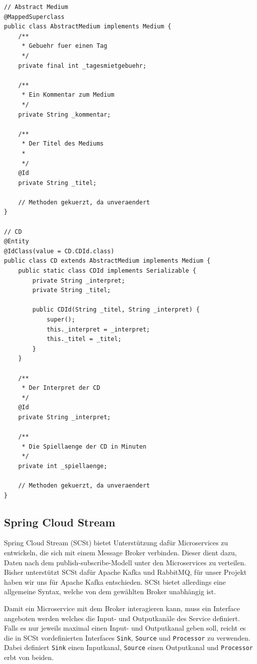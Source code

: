 \documentclass{article}
\begin{document}
\begin{lstlisting}
// Abstract Medium
@MappedSuperclass
public class AbstractMedium implements Medium {
    /**
     * Gebuehr fuer einen Tag
     */
    private final int _tagesmietgebuehr;

    /**
     * Ein Kommentar zum Medium
     */
    private String _kommentar;

    /**
     * Der Titel des Mediums
     *
     */
    @Id
    private String _titel;

    // Methoden gekuerzt, da unveraendert
}

// CD
@Entity
@IdClass(value = CD.CDId.class)
public class CD extends AbstractMedium implements Medium {
    public static class CDId implements Serializable {
        private String _interpret;
        private String _titel;

        public CDId(String _titel, String _interpret) {
            super();
            this._interpret = _interpret;
            this._titel = _titel;
        }
    }

    /**
     * Der Interpret der CD
     */
    @Id
    private String _interpret;

    /**
     * Die Spiellaenge der CD in Minuten
     */
    private int _spiellaenge;

    // Methoden gekuerzt, da unveraendert
}
\end{lstlisting}

\subsection{Spring Cloud Stream}

Spring Cloud Stream (SCSt) bietet Unterstützung dafür Microservices zu entwickeln, die sich mit einem Message Broker verbinden.
Dieser dient dazu, Daten nach dem publish-subscribe-Modell unter den Microservices zu verteilen.
Bisher unterstützt SCSt dafür Apache Kafka und RabbitMQ, für unser Projekt haben wir uns für Apache Kafka entschieden.
SCSt bietet allerdings eine allgemeine Syntax, welche von dem gewählten Broker unabhängig ist.

Damit ein Microservice mit dem Broker interagieren kann, muss ein Interface angeboten werden welches die Input- und Outputkanäle des Service definiert.
Falls es nur jeweils maximal einen Input- und Outputkanal geben soll, reicht es die in SCSt vordefinierten Interfaces \texttt{Sink}, \texttt{Source} und \texttt{Processor} zu verwenden.
Dabei definiert \texttt{Sink} einen Inputkanal, \texttt{Source} einen Outputkanal und \texttt{Processor} erbt von beiden.
\end{document}
